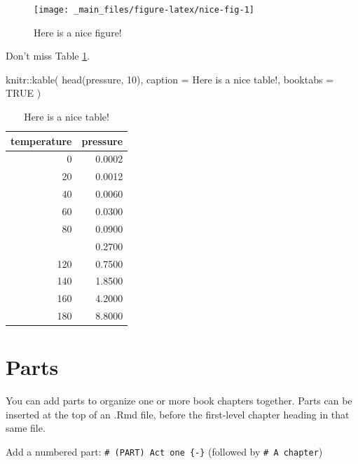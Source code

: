 \documentclass[
]{book}
\newenvironment{Shaded}{\begin{snugshade}}{\end{snugshade}}
\newcommand{\AttributeTok}[1]{\textcolor[rgb]{0.77,0.63,0.00}{#1}}
\newcommand{\ConstantTok}[1]{\textcolor[rgb]{0.00,0.00,0.00}{#1}}
\newcommand{\DecValTok}[1]{\textcolor[rgb]{0.00,0.00,0.81}{#1}}
\newcommand{\FunctionTok}[1]{\textcolor[rgb]{0.00,0.00,0.00}{#1}}
\newcommand{\NormalTok}[1]{#1}
\newcommand{\SpecialCharTok}[1]{\textcolor[rgb]{0.00,0.00,0.00}{#1}}
\newcommand{\StringTok}[1]{\textcolor[rgb]{0.31,0.60,0.02}{#1}}
\theoremstyle{definition}
\theoremstyle{definition}
\theoremstyle{definition}
\theoremstyle{definition}
\theoremstyle{remark}
\begin{document}
\begin{figure}

{\centering \texttt{[image: \_main\_files/figure-latex/nice-fig-1]} 

}

\caption{Here is a nice figure!}\label{fig:nice-fig}
\end{figure}

Don't miss Table \ref{tab:nice-tab}.

\begin{Shaded}
\begin{Highlighting}[]
\NormalTok{knitr}\SpecialCharTok{::}\FunctionTok{kable}\NormalTok{(}
  \FunctionTok{head}\NormalTok{(pressure, }\DecValTok{10}\NormalTok{), }\AttributeTok{caption =} \StringTok{\textquotesingle{}Here is a nice table!\textquotesingle{}}\NormalTok{,}
  \AttributeTok{booktabs =} \ConstantTok{TRUE}
\NormalTok{)}
\end{Highlighting}
\end{Shaded}

\begin{table}

\caption{\label{tab:nice-tab}Here is a nice table!}
\centering
\begin{tabular}[t]{rr}
\toprule
temperature & pressure\\
\midrule
0 & 0.0002\\
20 & 0.0012\\
40 & 0.0060\\
60 & 0.0300\\
80 & 0.0900\\
\addlinespace
100 & 0.2700\\
120 & 0.7500\\
140 & 1.8500\\
160 & 4.2000\\
180 & 8.8000\\
\bottomrule
\end{tabular}
\end{table}

\hypertarget{parts}{%
\chapter{Parts}\label{parts}}

You can add parts to organize one or more book chapters together. Parts can be inserted at the top of an .Rmd file, before the first-level chapter heading in that same file.

Add a numbered part: \texttt{\#\ (PART)\ Act\ one\ \{-\}} (followed by \texttt{\#\ A\ chapter})
\end{document}
